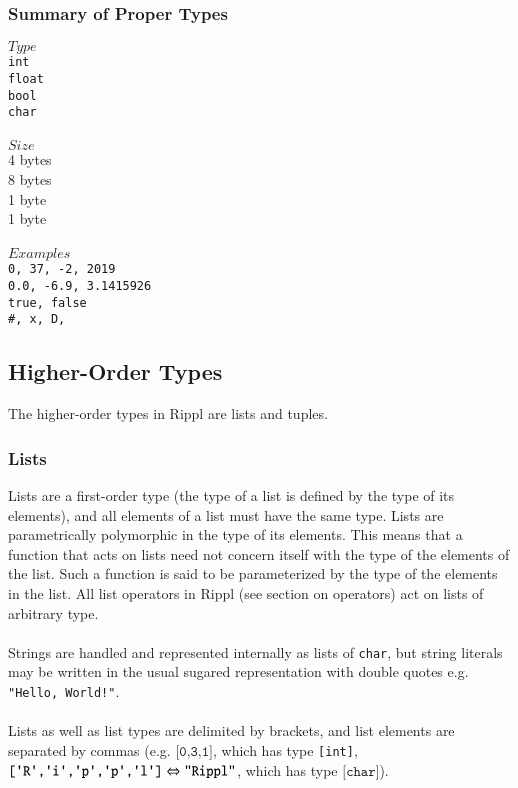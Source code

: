 \documentclass[5pt]{article}
\newcommand{\sq}{\textquotesingle}
\begin{document}
\subsubsection{Summary of Proper Types}
\begin{multicols}{3}
$Type$ \\
\hspace*{5mm} \texttt{int} \\
\hspace*{5mm} \texttt{float} \\
\hspace*{5mm} \texttt{bool} \\
\hspace*{5mm} \texttt{char} \\
\columnbreak \\
$Size$ \\
4 bytes \\
8 bytes \\
1 byte \\
1 byte \\
\columnbreak \\
$Examples$ \\
\texttt{0, 37, -2, 2019} \\
\texttt{0.0, -6.9, 3.1415926} \\
\texttt{true, false} \\
\texttt{\sq\#\sq, \sq x\sq, \sq D\sq, \sq \string\n \sq }  \\
\end{multicols}

\subsection{Higher-Order Types}
The higher-order types in Rippl are lists and tuples.
\subsubsection{Lists}
Lists are a first-order type (the type of a list is defined by the type of its elements), and all elements of a list must have the same type. Lists are parametrically polymorphic in the type of its elements. This means that a function that acts on lists need not concern itself with the type of the elements of the list. Such a function is said to be parameterized by the type of the elements in the list. All list operators in Rippl (see section on operators) act on lists of arbitrary type. \\\\
Strings are handled and represented internally as lists of \texttt{char}, but
string literals may be written in the usual sugared representation with double quotes e.g. \texttt{"Hello, World!"}.\\\\
Lists as well as list types are delimited by brackets, and list elements are separated by commas (e.g. $\texttt{[0,3,1]}$, which has type \texttt{[int]}, $\texttt{[\sq R\sq,\sq i\sq,\sq p\sq,\sq p\sq,\sq l\sq]}\Leftrightarrow \texttt{"Rippl"}$, which has type $\texttt{[char]}$).
\end{document}
